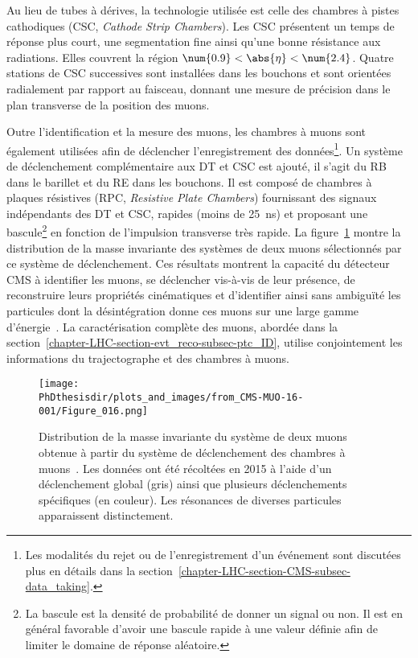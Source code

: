 Au lieu de tubes à dérives, la technologie utilisée est celle des chambres à pistes cathodiques (CSC, \emph{Cathode Strip Chambers}).
Les CSC présentent un temps de réponse plus court, une segmentation fine ainsi qu'une bonne résistance aux radiations.
Elles couvrent la région $\num{0.9}<\abs{\eta}<\num{2.4}$.
Quatre stations de CSC successives sont installées dans les bouchons et sont orientées radialement par rapport au faisceau, donnant une mesure de précision dans le plan transverse de la position des muons.
\par Outre l'identification et la mesure des muons, les chambres à muons sont également utilisées afin de déclencher l'enregistrement des données\footnote{Les modalités du rejet ou de l'enregistrement d'un événement sont discutées plus en détails dans la section~\ref{chapter-LHC-section-CMS-subsec-data_taking}.}.
Un système de déclenchement complémentaire aux DT et CSC est ajouté, il s'agit du RB dans le barillet et du RE dans les bouchons.
Il est composé de chambres à plaques résistives (RPC, \emph{Resistive Plate Chambers}) fournissant des signaux indépendants des DT et CSC, rapides (moins de \SI{25}{\nano\second}) et proposant une bascule\footnote{La bascule est la densité de probabilité de donner un signal ou non. Il est en général favorable d'avoir une bascule rapide à une valeur définie afin de limiter le domaine de réponse aléatoire.} en fonction de l'impulsion transverse très rapide.
La figure~\ref{fig-chapter-LHC-section-CMS-subsec-muons-CMS-MUO-16-001-Figure_016} montre la distribution de la masse invariante des systèmes de deux muons sélectionnés par ce système de déclenchement.
Ces résultats montrent la capacité du détecteur CMS à identifier les muons, se déclencher vis-à-vis de leur présence, de reconstruire leurs propriétés cinématiques et d'identifier ainsi sans ambiguïté les particules dont la désintégration donne ces muons sur une large gamme d'énergie~\cite{CMS-MUO-16-001}.
La caractérisation complète des muons, abordée dans la section~\ref{chapter-LHC-section-evt_reco-subsec-ptc_ID}, utilise conjointement les informations du trajectographe et des chambres à muons.
\begin{figure}[h]
\centering
\texttt{[image: \\PhDthesisdir/plots\_and\_images/from\_CMS-MUO-16-001/Figure\_016.png]}
\caption[Distribution de la masse invariante de deux muons.]{Distribution de la masse invariante du système de deux muons obtenue à partir du système de déclenchement des chambres à muons~\cite{CMS-MUO-16-001}. Les données ont été récoltées en 2015 à l'aide d'un déclenchement global (gris) ainsi que plusieurs déclenchements spécifiques (en couleur). Les résonances de diverses particules apparaissent distinctement.}
\label{fig-chapter-LHC-section-CMS-subsec-muons-CMS-MUO-16-001-Figure_016}
\end{figure}